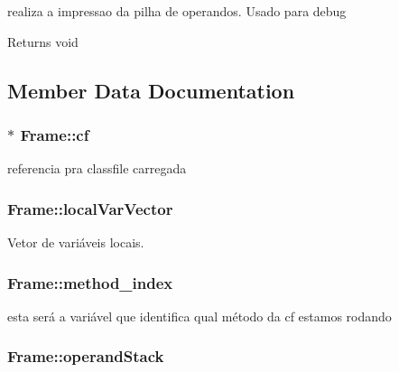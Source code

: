 realiza a impressao da pilha de operandos. Usado para debug 

\begin{DoxyReturn}{Returns}
void 
\end{DoxyReturn}


\subsection{Member Data Documentation}
\hypertarget{classFrame_a1adaa34d477660f1e9d45904576eacf2}{
\subsubsection[{cf}]{\setlength{\rightskip}{0pt plus 5cm}$\ast$ Frame\+::cf}}\label{classFrame_a1adaa34d477660f1e9d45904576eacf2}


referencia pra classfile carregada 

\hypertarget{classFrame_ab3b3b8b51af39a6c4b76bc99bffd8808}{
\subsubsection[{local\+Var\+Vector}]{\setlength{\rightskip}{0pt plus 5cm}Frame\+::local\+Var\+Vector}}\label{classFrame_ab3b3b8b51af39a6c4b76bc99bffd8808}


Vetor de variáveis locais. 

\hypertarget{classFrame_a9a7eb96be80ac389517368b48f88e1f5}{
\subsubsection[{method\+\_\+index}]{\setlength{\rightskip}{0pt plus 5cm}Frame\+::method\+\_\+index}}\label{classFrame_a9a7eb96be80ac389517368b48f88e1f5}


esta será a variável que identifica qual método da cf estamos rodando 

\hypertarget{classFrame_ad8d3859aa247f9ea26ed70734dd93141}{
\subsubsection[{operand\+Stack}]{\setlength{\rightskip}{0pt plus 5cm}Frame\+::operand\+Stack}}\label{classFrame_ad8d3859aa247f9ea26ed70734dd93141}


